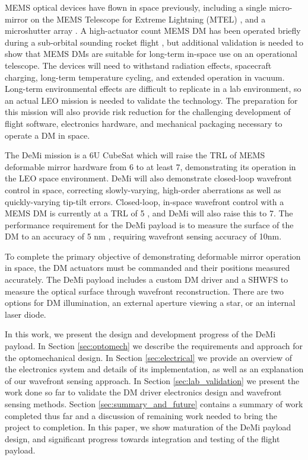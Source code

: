\documentclass[]{spie}  %
\begin{document}
\gls{MEMS} optical devices have flown in space previously, including a single micro-mirror on the \gls{MEMS} Telescope for Extreme Lightning (MTEL) \cite{nam_telescope_2008,jeon_performance_2016}, and a microshutter array \cite{fleming_calibration_2013}. A high-actuator count \gls{MEMS} \gls{DM} has been operated briefly during a sub-orbital sounding rocket flight \cite{douglas_wavefront_2018}, but additional validation is needed to show that \gls{MEMS} \gls{DM}s are suitable for long-term in-space use on an operational telescope. The devices will need to withstand radiation effects, spacecraft charging, long-term temperature cycling, and extended operation in vacuum. Long-term environmental effects are difficult to replicate in a lab environment, so an actual \gls{LEO} mission is needed to validate the technology. The preparation for this mission will also provide risk reduction for the challenging development of flight software, electronics hardware, and mechanical packaging necessary to operate a DM in space.

The DeMi mission\cite{cahoy_wavefront_2013, douglas_design_2017-1,marinan_improving_2016} is a 6U CubeSat  which will raise the \gls{TRL} of \gls{MEMS} deformable mirror hardware from 6 \cite{douglas_wavefront_2018} to at least 7, demonstrating its operation in the \gls{LEO} space environment. 
DeMi will also demonstrate closed-loop wavefront control in space, correcting slowly-varying, high-order aberrations as well as quickly-varying tip-tilt errors. Closed-loop, in-space wavefront control with a MEMS DM is currently at a \gls{TRL} of 5 \cite{giveon_broadband_2007,rao_path_2008,bendek_development_2016}, and DeMi will also raise this to 7. The performance requirement for the DeMi payload is to measure the surface of the DM to an accuracy of 5 nm \cite{marinan_improving_2016}, requiring wavefront sensing accuracy of 10nm.

To complete the primary objective of demonstrating deformable mirror operation in space, the DM actuators must be commanded and their positions measured accurately. The DeMi payload includes a custom DM driver and a \gls{SHWFS} to measure the optical surface through wavefront reconstruction. 
There are two options for \gls{DM} illumination, an external aperture viewing a star, or an internal laser diode.

In this work, we present the design and development progress of the DeMi payload. In Section \ref{sec:optomech} we describe the requirements and approach for the optomechanical design. In Section \ref{sec:electrical} we provide an overview of the electronics system and details of its implementation, as well as an explanation of our wavefront sensing approach. In Section \ref{sec:lab_validation} we present the work done so far to validate the DM driver electronics design and wavefront sensing methods. Section \ref{sec:summary_and_future} contains a summary of work completed thus far and a discussion of remaining work needed to bring the project to completion. In this paper, we show maturation of the DeMi payload design, and significant progress towards integration and testing of the flight payload.
\end{document}
